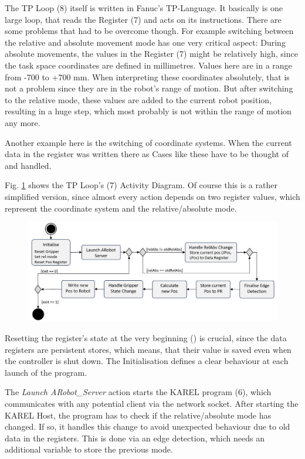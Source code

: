 The TP Loop (8) itself is written in Fanuc's TP-Language. It basically is one large loop, that reads the Register (7) and acts on its instructions. There are some problems that had to be overcome though. For example switching between the relative and absolute movement mode has one very critical aspect: During absolute movements, the values in the Register (7) might be relatively high, since the task space coordinates are defined in millimetres. Values here are in a range from -700 to +700 mm. When interpreting these coordinates absolutely, that is not a problem since they are in the robot's range of motion. But after switching to the relative mode, these values are added to the current robot position, resulting in a huge step, which most probably is not within the range of motion any more.

Another example here is the switching of coordinate systems. When the current data in the register was written there as  Cases like these have to be thought of and handled. 

Fig. \ref{Fig:TPLoopFlowChart} shows the TP Loop's (7) Activity Diagram. Of course this is a rather simplified version, since almost every action depends on two register values, which represent the coordinate system and the relative/absolute mode. 

\begin{figure}
	\centering
	\includegraphics[width=0.9\linewidth]{Figures/TPLoopFlowChart.jpg}
	\caption{}
	\label{Fig:TPLoopFlowChart}
\end{figure}

Resetting the register's state at the very beginning () is crucial, since the data registers are persistent stores, which means, that their value is saved even when the controller is shut down. The Initialisation defines a clear behaviour at each launch of the program.

The \textit{Launch ARobot\_Server} action starts the KAREL program (6), which communicates with any potential client via the network socket. After starting the KAREL Host, the program has to check if the relative/absolute mode has changed. If so, it handles this change to avoid unexpected behaviour due to old data in the registers. This is done via an edge detection, which needs an additional variable to store the previous mode. 


